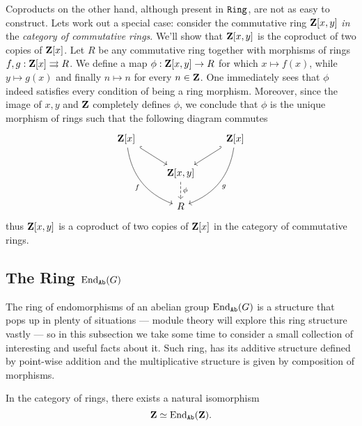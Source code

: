 \begin{remark}
    \label{rem:coproduct-Z[x,y]}
    Coproducts on the other hand, although present in \({\texttt{Ring}}\), are not as easy to
    construct. Lets work out a special case: consider the commutative ring
    \(\mathbf{Z}[x, y]\) \emph{in} the \emph{category of commutative rings}. We'll show that
    \(\mathbf{Z}[x, y]\) is the coproduct of two copies of \(\mathbf{Z}[x]\). Let \(R\) be any
    commutative ring together with morphisms of rings \(f, g: \mathbf{Z}[x]
    \rightrightarrows R\). We define a map \(\phi: \mathbf{Z}[x, y] \to R\) for which \(x
    \mapsto f(x)\), while \(y \mapsto g(x)\) and finally \(n \mapsto n\) for every
    \(n \in \mathbf{Z}\). One immediately sees that \(\phi\) indeed satisfies every
    condition of being a ring morphism. Moreover, since the image of \(x, y\) and
    \(\mathbf{Z}\) completely defines \(\phi\), we conclude that \(\phi\) is the unique
    morphism of rings such that the following diagram commutes
    \[
        \begin{tikzcd}
            \Z[x] \ar[dr, hook] \ar[rdd, bend right, swap, "f"]
            & &\Z[x] \ar[dl, hook'] \ar[dld, bend left, "g"] \\
            &\Z[x, y] \ar[d, dashed, "\phi"] & \\
            &R &
        \end{tikzcd}
    \]
    thus \(\mathbf{Z}[x, y]\) is a coproduct of two copies of \(\mathbf{Z}[x]\) in the category of
    commutative rings.
\end{remark}

\subsection{The Ring \texorpdfstring{\(\operatorname{End}_{{\texttt{Ab}}}(G)\)}{End\_Ab(G)}}

The ring of endomorphisms of an abelian group \(\operatorname{End}_{{\texttt{Ab}}}(G)\) is a structure
that pops up in plenty of situations --- module theory will explore this ring
structure vastly --- so in this subsection we take some time to consider a small
collection of interesting and useful facts about it. Such ring, has its additive
structure defined by point-wise addition and the multiplicative structure is
given by composition of morphisms.

%
\begin{proposition}
    \label{prop:Z-isomorphic-End(Z)-in-Ring}
    In the category of rings, there exists a natural isomorphism
    \[
        \mathbf{Z} \simeq \operatorname{End}_{{\texttt{Ab}}}(\mathbf{Z}).
    \]
\end{proposition}
%

